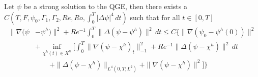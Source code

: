 \begin{thm} \label{thm:StrongConvergence}
  Let $\psi$ be a strong solution to the QGE, then there exists a \\ $C(T, F,
  \psi_0, \Gamma_1, \Gamma_2, Re, Ro,\int_0^T\! |\Delta \psi|^4\, dt)$ such that
  for all $t\in [0,T]$
  \begin{equation}
    \begin{split}
      \|\nabla (\psi &- \psi^h) \|^2 + Re^{-1}
        \int_{0}^{T}\! \|\Delta (\psi - \psi^h)\|^2 \, dt \le C\biggl\{
        \|\nabla(\psi_0 - \psi^h(0))\|^2 \\
      & + \inf_{\chi^h(t) \in X^h} \biggl[
        \int_0^T\! \|\nabla(\psi - \chi^h)_t\|^2_{-1}
        + Re^{-1} \|\Delta(\psi - \chi^h)\|^2\, dt \\
      & \qquad + \|\Delta(\psi - \chi^h)\|_{L^4(0,T;L^2)}
        + \|\nabla (\psi - \chi^h)\|^2\biggr] \biggr\}
    \end{split}
    \label{eqn:StrongConvergence}
  \end{equation}
\end{thm}
